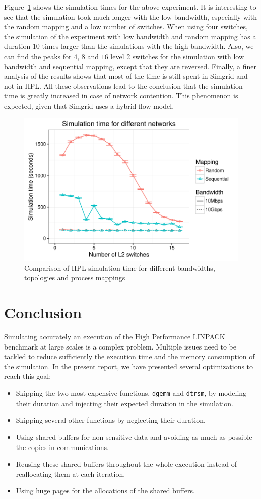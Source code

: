 \documentclass[12pt, a4paper]{memoir}
\begin{document}
Figure~\ref{fig:capacity_planning_topology_sim_time} shows the simulation times for the above experiment. It is
interesting to see that the simulation took much longer with the low bandwidth, especially with the random mapping
and a low number of switches. When using four switches, the simulation of the experiment with low bandwidth and
random mapping has a duration 10 times larger than the simulations with the high bandwidth. Also, we can find the
peaks for \(4\), \(8\) and \(16\) level 2 switches for the simulation with low bandwidth and sequential mapping, except
that they are reversed. Finally, a finer analysis of the results shows that most of the time is still spent in
Simgrid and not in HPL. All these observations lead to the conclusion that the simulation time is greatly increased
in case of network contention. This phenomenon is expected, given that Simgrid uses a hybrid flow model.
\begin{figure}[htpb]
\centering
\includegraphics[width=0.8\linewidth]{../capacity_planning/topology_sim_time.pdf}
\caption{Comparison of HPL simulation time for different bandwidths, topologies and process mappings}
\label{fig:capacity_planning_topology_sim_time}
\end{figure}
\chapter{Conclusion}
\label{sec:orgfb06aa7}
Simulating accurately an execution of the High Performance LINPACK benchmark at large scales is a complex
problem. Multiple issues need to be tackled to reduce sufficiently the execution time and the memory consumption of
the simulation. In the present report, we have presented several optimizations to reach this goal:
\begin{itemize}
\item Skipping the two most expensive functions, \texttt{dgemm} and \texttt{dtrsm}, by modeling their duration and injecting their expected
duration in the simulation.
\item Skipping several other functions by neglecting their duration.
\item Using shared buffers for non-sensitive data and avoiding as much as possible the copies in communications.
\item Reusing these shared buffers throughout the whole execution instead of reallocating them at each iteration.
\item Using huge pages for the allocations of the shared buffers.
\end{itemize}
\end{document}
